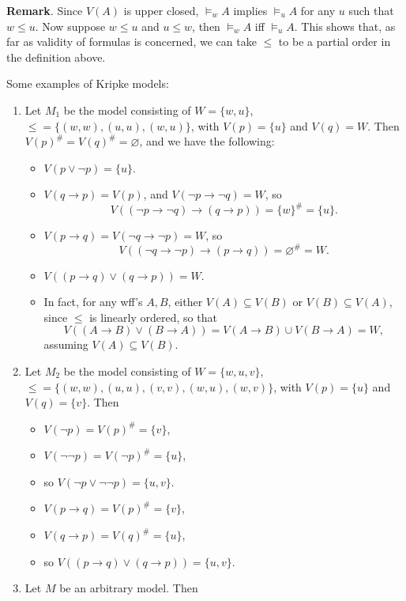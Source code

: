 \documentclass[12pt]{article}
\begin{document}
\textbf{Remark}.  Since $V(A)$ is upper closed, $\models_w A$ implies $\models_u A$ for any $u$ such that $w\le u$.  Now suppose $w\le u$ and $u\le w$, then $\models_w A$ iff $\models_u A$.  This shows that, as far as validity of formulas is concerned, we can take $\le$ to be a partial order in the definition above.

Some examples of Kripke models:
\begin{enumerate}
\item Let $M_1$ be the model consisting of $W=\lbrace w,u\rbrace$, $\le = \lbrace (w,w),(u,u),(w,u)\rbrace$, with $V(p)=\lbrace u \rbrace$ and $V(q)=W$.  Then $V(p)^{\#}=V(q)^{\#}=\varnothing$, and we have the following:
\begin{itemize}
\item $V(p\lor \neg p)=\lbrace u\rbrace$.
\item $V(q\to p)=V(p)$, and $V(\neg p \to \neg q)= W$, so $$V((\neg p \to \neg q) \to (q\to p))= \lbrace w \rbrace ^{\#} = \lbrace u \rbrace.$$
\item $V(p\to q)= V(\neg q \to \neg p)= W$, so $$V((\neg q \to \neg p) \to (p\to q))= \varnothing ^{\#} = W.$$
\item $V((p\to q)\lor (q\to p))=W$.
\item In fact, for any wff's $A,B$, either $V(A)\subseteq V(B)$ or $V(B)\subseteq V(A)$, since $\le$ is linearly ordered, so that $$V((A\to B)\lor (B\to A))=V(A\to B)\cup V(B\to A) = W, $$
assuming $V(A)\subseteq V(B)$.
\end{itemize}
\item Let $M_2$ be the model consisting of $W=\lbrace w,u,v\rbrace$, $\le = \lbrace (w,w),(u,u),(v,v),(w,u),(w,v)\rbrace$, with $V(p)=\lbrace u \rbrace$ and $V(q)=\lbrace v \rbrace$.  Then
\begin{itemize}
\item $V(\neg p)=V(p)^{\#} = \lbrace v\rbrace$,
\item $V(\neg \neg p)=V(\neg p)^{\#} = \lbrace u\rbrace$,
\item so $V(\neg p \lor \neg \neg p)=\lbrace u,v\rbrace$.
\item $V(p \to q)= V(p)^{\#} = \lbrace v\rbrace$, 
\item $V(q \to p)=V(q)^{\#} = \lbrace u \rbrace$, 
\item so $V((p\to q)\lor (q\to p))=\lbrace u,v\rbrace$.
\end{itemize}
\item Let $M$ be an arbitrary model.  Then
\begin{itemize}

\end{itemize}
\end{enumerate}
\end{document}
